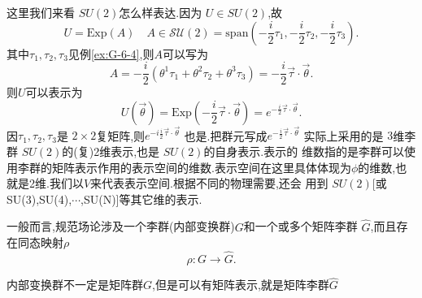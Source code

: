 \documentclass[../main.tex]{subfiles}
\begin{document}
这里我们来看 $SU(2)$怎么样表达.因为 $U \in SU(2)$,故\[
  U = \text{Exp}(A) \quad A\in \mathscr{SU}(2) = \text{span}(-\frac{i}{2}\tau_1,-\frac{i}{2}\tau_2,-\frac{i}{2}\tau_3)
.\] 
其中$\tau_1,\tau_2,\tau_3$见例\ref{ex:G-6-4},则$A$可以写为 \[
  A = -\frac{i}{2}(\theta^1\tau_1 + \theta^2 \tau_2 +\theta^3 \tau_3) = -\frac{i}{2} \vec{\tau}\cdot \vec{\theta} 
.\] 
则$U$可以表示为 \[
  U(\vec{\theta}) = \text{Exp}(- \frac{i}{2} \vec{\tau}\cdot \vec{\theta}) = e^{- \frac{i}{2} \vec{\tau}\cdot \vec{\theta}}
.\] 
因$\tau_1,\tau_2,\tau_3$是 $2\times 2$复矩阵,则$e^{-i \frac{i}{2}\vec{\tau}\cdot \vec{\theta}}$ 也是.把群元写成$e^{-\frac{i}{2} \vec{\tau}\cdot \vec{\theta}}$ 实际上采用的是 $3$维李群 $SU(2)$的(复)2维表示,也是 $SU(2)$的自身表示.表示的
维数指的是李群可以使用李群的矩阵表示作用的表示空间的维数.表示空间在这里具体体现为$\phi$的维数,也就是2维.我们以$V$来代表表示空间.根据不同的物理需要,还会
用到 $SU(2)$[或SU(3),SU(4),$\cdots$,SU(N)]等其它维的表示.
 
一般而言,规范场论涉及一个李群(内部变换群)$G$和一个或多个矩阵李群 $\hat{G}$,而且存在同态映射$\rho$\[
 \rho : G \to \hat{G} 
  .\] 
  \begin{note}
    内部变换群不一定是矩阵群$G$,但是可以有矩阵表示,就是矩阵李群$\hat{G}$
  \end{note}
\end{document}
